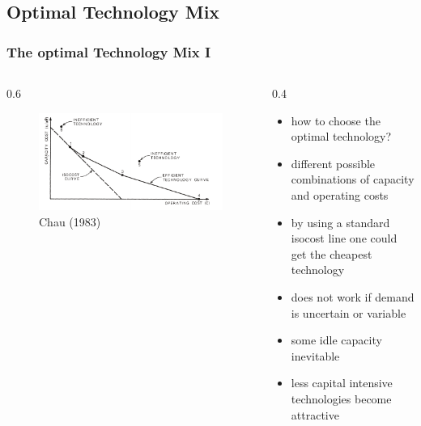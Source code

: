 \subsection{Optimal Technology Mix}

\begin{frame}

\frametitle{The optimal Technology Mix I}
\begin{columns}
\begin{column} {0.6\textwidth}

\begin{figure}[h]
\centering
\includegraphics[width=1.\textwidth]{capacity/technology_choice_chow}
    \caption{Chau (1983)}
    \label{fig:Daten 2004}            
\end{figure}
\end{column}

\begin{column} {0.4\textwidth}
\begin{itemize}
\item how to choose the optimal technology?
\item different possible combinations of capacity and operating costs
\item by using a standard isocost line one could get the cheapest technology
\item does not work if demand is uncertain or variable
\item some idle capacity inevitable
\item less capital intensive technologies become attractive
\end {itemize}

\end{column}
\end{columns}

\end{frame}			

